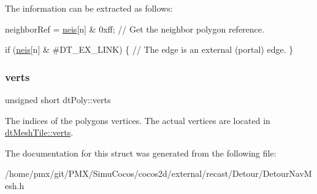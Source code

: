 The information can be extracted as follows\+: 
\begin{DoxyCode}
neighborRef = \hyperlink{structdtPoly_ac4f5aa32df32aa5b1385f76f697376af}{neis}[n] & 0xff; \textcolor{comment}{// Get the neighbor polygon reference.}

\textcolor{keywordflow}{if} (\hyperlink{structdtPoly_ac4f5aa32df32aa5b1385f76f697376af}{neis}[n] & #DT\_EX\_LINK)
\{
    \textcolor{comment}{// The edge is an external (portal) edge.}
\}
\end{DoxyCode}
 \mbox{\label{structdtPoly_acbba5c3a3786095481c087a1963e20b5}} 
\subsubsection{\texorpdfstring{verts}{verts}}
{\footnotesize\ttfamily unsigned short dt\+Poly\+::verts}

The indices of the polygon\textquotesingle{}s vertices. The actual vertices are located in \hyperlink{structdtMeshTile_a60f96b0153e3e8ef689f29ef03d61321}{dt\+Mesh\+Tile\+::verts}. 

The documentation for this struct was generated from the following file\+:\begin{DoxyCompactItemize}
\item 
/home/pmx/git/\+P\+M\+X/\+Simu\+Cocos/cocos2d/external/recast/\+Detour/Detour\+Nav\+Mesh.\+h\end{DoxyCompactItemize}
